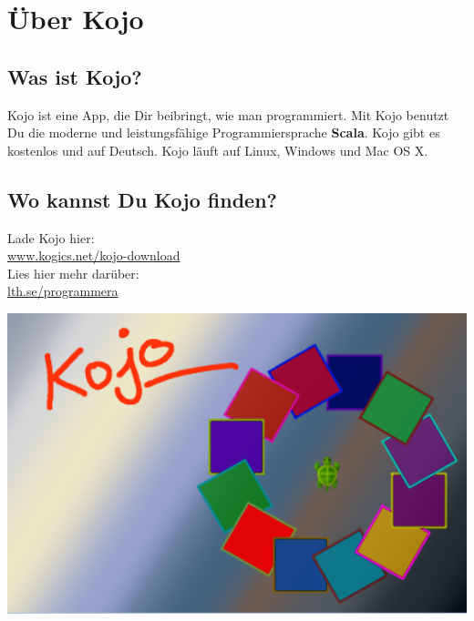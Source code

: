 \chapter{Über Kojo}
\begin{multicols}{2}
\section*{\color{black}Was ist Kojo?}
Kojo ist eine App, die Dir beibringt, wie man programmiert. Mit Kojo benutzt Du die moderne und leistungsfähige Programmiersprache {\bf\color{blue}Scala}. Kojo gibt es kostenlos und auf Deutsch. Kojo läuft auf Linux, Windows und Mac OS X.
\section*{\color{black}Wo kannst Du Kojo finden?}
Lade Kojo hier: 
\\

\href{http://www.kogics.net/kojo-download}{www.kogics.net/kojo-download}
\\

Lies hier mehr darüber: 
\\

\href{http://lth.se/programmera}{lth.se/programmera}

\columnbreak

\begin{center}
\includegraphics[width=14.0cm]{../img/kojo.png}
\end{center}

\end{multicols}

